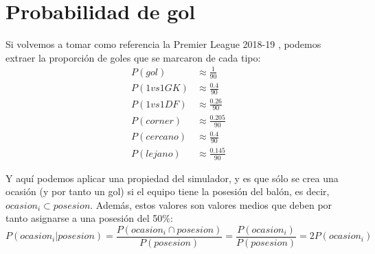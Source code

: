 \documentclass[a4paper,9pt]{article}
\begin{document}
\section{Probabilidad de gol}\label{sec:ProbGol}
\def \Pgol {\ensuremath{\frac{1}{90}}}
\def \PGvsGK {\ensuremath{\frac{0.4}{90}}}
\def \PGvsDF {\ensuremath{\frac{0.26}{90}}}
\def \PGcorner {\ensuremath{\frac{0.205}{90}}}
\def \PGclose {\ensuremath{\frac{0.4}{90}}}
\def \PGfar {\ensuremath{\frac{0.145}{90}}}
Si volvemos a tomar como referencia la Premier League 2018-19 \cite{PremierLeague}, podemos extraer la proporción de goles que se marcaron de cada tipo:
\begin{align}
	P(gol)&\approx\Pgol\\
	P(1vs1GK)&\approx\PGvsGK\\
	P(1vs1DF)&\approx\PGvsDF\\
	P(corner)&\approx\PGcorner\\
	P(cercano)&\approx\PGclose\\
	P(lejano)&\approx\PGfar
\end{align}

Y aquí podemos aplicar una propiedad del simulador, y es que sólo se crea una ocasión (y por tanto un gol) si el equipo tiene la posesión del balón, es decir, $ocasion_i\subset posesion$. Además, estos valores son valores medios que deben por tanto asignarse a una posesión del 50\%:
\begin{equation}\label{eq:proboccomp}
	P(ocasion_i|posesion)=\frac{P(ocasion_i\cap posesion)}{P(posesion)}=\frac{P(ocasion_i)}{P(posesion)}=2P(ocasion_i)
\end{equation}
\end{document}
